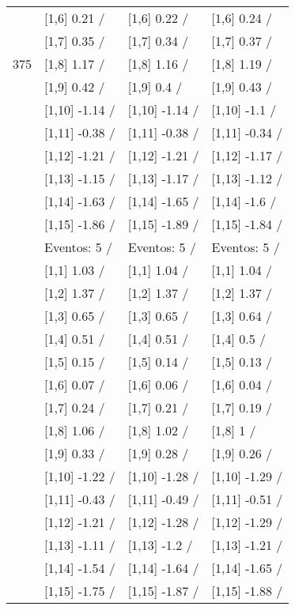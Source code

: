 \begin{table}
\begin{tabular}[t]{llll}
 & {}[1,6] 0.21  / & {}[1,6] 0.22  / & {}[1,6] 0.24  /\\
 & {}[1,7] 0.35  / & {}[1,7] 0.34  / & {}[1,7] 0.37  /\\
375 & {}[1,8] 1.17  / & {}[1,8] 1.16  / & {}[1,8] 1.19  /\\
\addlinespace
 & {}[1,9] 0.42  / & {}[1,9] 0.4  / & {}[1,9] 0.43  /\\
 & {}[1,10] -1.14  / & {}[1,10] -1.14  / & {}[1,10] -1.1  /\\
 & {}[1,11] -0.38  / & {}[1,11] -0.38  / & {}[1,11] -0.34  /\\
 & {}[1,12] -1.21  / & {}[1,12] -1.21  / & {}[1,12] -1.17  /\\
 & {}[1,13] -1.15  / & {}[1,13] -1.17  / & {}[1,13] -1.12  /\\
\addlinespace
 & {}[1,14] -1.63  / & {}[1,14] -1.65  / & {}[1,14] -1.6  /\\
 & {}[1,15] -1.86  / & {}[1,15] -1.89  / & {}[1,15] -1.84  /\\
 & Eventos:  5 / & Eventos:  5 / & Eventos:  5 /\\
 & {}[1,1] 1.03  / & {}[1,1] 1.04  / & {}[1,1] 1.04  /\\
 & {}[1,2] 1.37  / & {}[1,2] 1.37  / & {}[1,2] 1.37  /\\
\addlinespace
 & {}[1,3] 0.65  / & {}[1,3] 0.65  / & {}[1,3] 0.64  /\\
 & {}[1,4] 0.51  / & {}[1,4] 0.51  / & {}[1,4] 0.5  /\\
 & {}[1,5] 0.15  / & {}[1,5] 0.14  / & {}[1,5] 0.13  /\\
 & {}[1,6] 0.07  / & {}[1,6] 0.06  / & {}[1,6] 0.04  /\\
 & {}[1,7] 0.24  / & {}[1,7] 0.21  / & {}[1,7] 0.19  /\\
\addlinespace
500 & {}[1,8] 1.06  / & {}[1,8] 1.02  / & {}[1,8] 1  /\\
 & {}[1,9] 0.33  / & {}[1,9] 0.28  / & {}[1,9] 0.26  /\\
 & {}[1,10] -1.22  / & {}[1,10] -1.28  / & {}[1,10] -1.29  /\\
 & {}[1,11] -0.43  / & {}[1,11] -0.49  / & {}[1,11] -0.51  /\\
 & {}[1,12] -1.21  / & {}[1,12] -1.28  / & {}[1,12] -1.29  /\\
\addlinespace
 & {}[1,13] -1.11  / & {}[1,13] -1.2  / & {}[1,13] -1.21  /\\
 & {}[1,14] -1.54  / & {}[1,14] -1.64  / & {}[1,14] -1.65  /\\
 & {}[1,15] -1.75  / & {}[1,15] -1.87  / & {}[1,15] -1.88  /\\
\bottomrule
\end{tabular}
\end{table}
